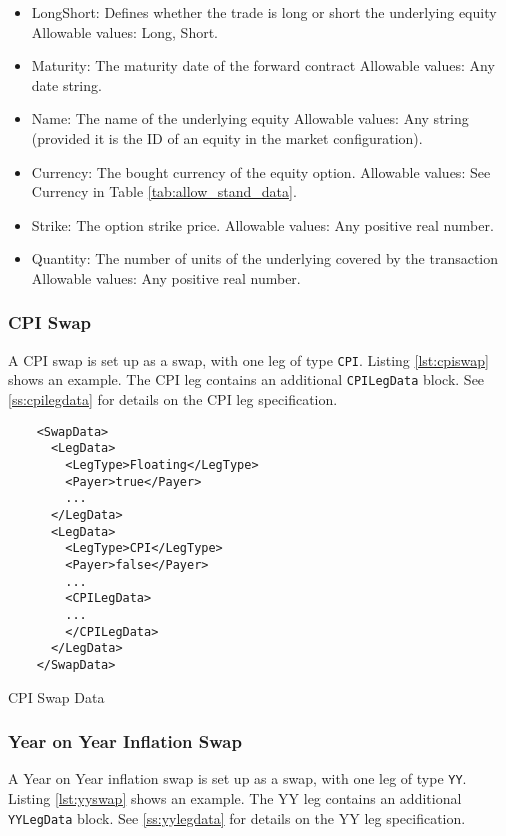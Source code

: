 \begin{itemize}
	\item LongShort: Defines whether the trade is long or short the underlying equity
	Allowable values: Long, Short.
	\item Maturity: The maturity date of the forward contract
	Allowable values: Any date string.
	\item Name: The name of the underlying equity 	
	Allowable values:  Any string (provided it is the ID of an equity in the market configuration).
	\item Currency: The bought currency of the equity option.  	
	Allowable values:  See Currency in Table \ref{tab:allow_stand_data}.	
	\item Strike: The option strike price.  
	Allowable values:  Any positive real number.	
	\item Quantity: The number of units of the underlying covered by the transaction  
	Allowable values:  Any positive real number.
\end{itemize}

\subsubsection{CPI Swap}

A CPI swap is set up as a swap, with one leg of type {\tt CPI}. Listing \ref{lst:cpiswap} shows an example. The
CPI leg contains an additional {\tt CPILegData} block. See \ref{ss:cpilegdata} for details on the CPI leg specification.

\begin{listing}[H]
\begin{verbatim}
    <SwapData>
      <LegData>
        <LegType>Floating</LegType>
        <Payer>true</Payer>
        ...
      </LegData>
      <LegData>
        <LegType>CPI</LegType>
        <Payer>false</Payer>
        ...
        <CPILegData>
        ...
        </CPILegData>
      </LegData>
    </SwapData>
\end{verbatim}
\caption{CPI Swap Data}
\label{lst:cpiswap}
\end{listing}

\subsubsection{Year on Year Inflation Swap}

A Year on Year inflation swap is set up as a swap, with one leg of type {\tt YY}. Listing \ref{lst:yyswap} shows an
example. The YY leg contains an additional {\tt YYLegData} block. See \ref{ss:yylegdata} for details on the YY leg
specification.

